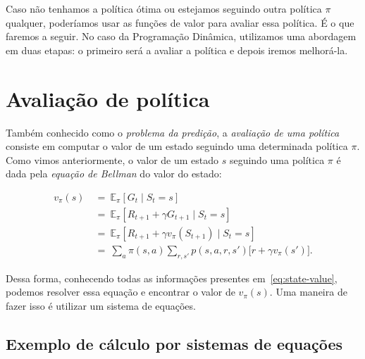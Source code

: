 \documentclass{article}
\begin{document}
            Caso não tenhamos a política ótima ou estejamos seguindo outra política $\pi$ qualquer, poderíamos usar as funções de valor para avaliar essa política. É o que faremos a seguir. No caso da Programação Dinâmica, utilizamos uma abordagem em duas etapas: o primeiro será a avaliar a política e depois iremos melhorá-la.
            
    \section{Avaliação de política}
    
        Também conhecido como o \emph{problema da predição}, a \emph{avaliação de uma política} consiste em computar o valor de um estado seguindo uma determinada política $\pi$. Como vimos anteriormente, o valor de um estado $s$ seguindo uma política $\pi$ é dada pela \emph{equação de Bellman} do valor do estado:
    
        \begin{equation}
            \label{eq:state-value}
            \begin{aligned}
                v_{\pi}(s) 
                & \ = \ \mathbb{E}_{\pi} \left[ G_t \mid S_t = s \right] \\
                & \ = \ \mathbb{E}_{\pi} \left[ R_{t+1} + \gamma G_{t+1} \mid S_t = s \right] \\
                & \ = \ \mathbb{E}_{\pi} \left[ R_{t+1} + \gamma v_{\pi}(S_{t+1}) \mid S_t = s \right] \\
                & \ = \ \sum_a \pi(s, a) \sum_{r, s'} p(s, a, r, s') \Big[ r + \gamma v_{\pi}(s') \Big] .
            \end{aligned}
        \end{equation}
    
        Dessa forma, conhecendo todas as informações presentes em~\eqref{eq:state-value}, podemos resolver essa equação e encontrar o valor de $v_{\pi}(s)$. Uma maneira de fazer isso é utilizar um sistema de equações.
    
        \subsection{Exemplo de cálculo por sistemas de equações}
        
\end{document}
